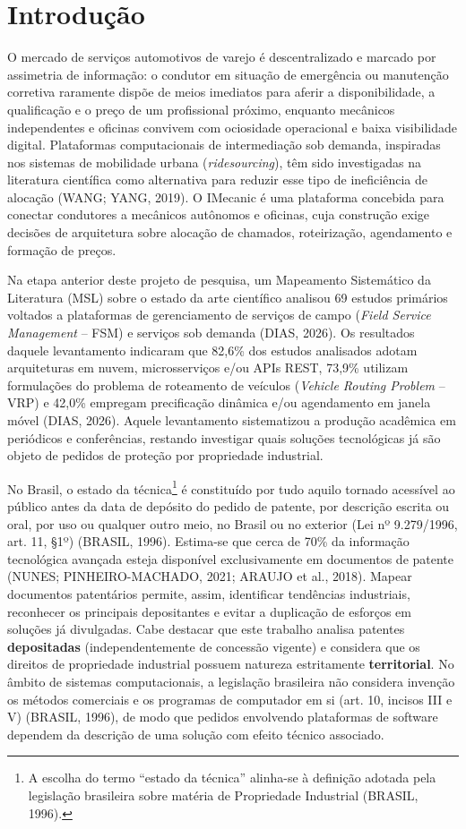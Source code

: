 \documentclass[12pt,a4paper]{article}
\begin{document}
\newpage
\section{Introdução}

O mercado de serviços automotivos de varejo é descentralizado e marcado por assimetria de informação: o condutor em situação de emergência ou manutenção corretiva raramente dispõe de meios imediatos para aferir a disponibilidade, a qualificação e o preço de um profissional próximo, enquanto mecânicos independentes e oficinas convivem com ociosidade operacional e baixa visibilidade digital. Plataformas computacionais de intermediação sob demanda, inspiradas nos sistemas de mobilidade urbana (\textit{ridesourcing}), têm sido investigadas na literatura científica como alternativa para reduzir esse tipo de ineficiência de alocação (WANG; YANG, 2019). O IMecanic é uma plataforma concebida para conectar condutores a mecânicos autônomos e oficinas, cuja construção exige decisões de arquitetura sobre alocação de chamados, roteirização, agendamento e formação de preços.

Na etapa anterior deste projeto de pesquisa, um Mapeamento Sistemático da Literatura (MSL) sobre o estado da arte científico analisou 69 estudos primários voltados a plataformas de gerenciamento de serviços de campo (\textit{Field Service Management} -- FSM) e serviços sob demanda (DIAS, 2026). Os resultados daquele levantamento indicaram que 82,6\% dos estudos analisados adotam arquiteturas em nuvem, microsserviços e/ou APIs REST, 73,9\% utilizam formulações do problema de roteamento de veículos (\textit{Vehicle Routing Problem} -- VRP) e 42,0\% empregam precificação dinâmica e/ou agendamento em janela móvel (DIAS, 2026). Aquele levantamento sistematizou a produção acadêmica em periódicos e conferências, restando investigar quais soluções tecnológicas já são objeto de pedidos de proteção por propriedade industrial.

No Brasil, o estado da técnica\footnote{A escolha do termo ``estado da técnica'' alinha-se à definição adotada pela legislação brasileira sobre matéria de Propriedade Industrial (BRASIL, 1996).} é constituído por tudo aquilo tornado acessível ao público antes da data de depósito do pedido de patente, por descrição escrita ou oral, por uso ou qualquer outro meio, no Brasil ou no exterior (Lei nº 9.279/1996, art. 11, §1º) (BRASIL, 1996). Estima-se que cerca de 70\% da informação tecnológica avançada esteja disponível exclusivamente em documentos de patente (NUNES; PINHEIRO-MACHADO, 2021; ARAUJO et al., 2018). Mapear documentos patentários permite, assim, identificar tendências industriais, reconhecer os principais depositantes e evitar a duplicação de esforços em soluções já divulgadas. Cabe destacar que este trabalho analisa patentes \textbf{depositadas} (independentemente de concessão vigente) e considera que os direitos de propriedade industrial possuem natureza estritamente \textbf{territorial}. No âmbito de sistemas computacionais, a legislação brasileira não considera invenção os métodos comerciais e os programas de computador em si (art. 10, incisos III e V) (BRASIL, 1996), de modo que pedidos envolvendo plataformas de software dependem da descrição de uma solução com efeito técnico associado.
\end{document}
